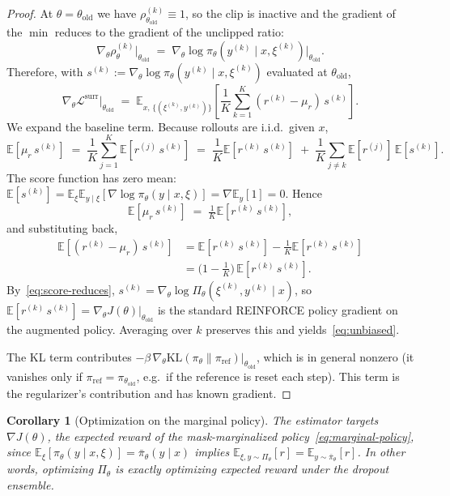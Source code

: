 \documentclass[11pt]{article}
\newtheorem{corollary}[theorem]{Corollary}
\theoremstyle{definition}
\theoremstyle{remark}
\newcommand{\E}{\mathbb{E}}
\newcommand{\KL}{\mathrm{KL}}
\newcommand{\Loss}{\mathcal{L}}
\newcommand{\old}{\mathrm{old}}
\begin{document}
\begin{proof}
At $\theta = \theta_\old$ we have $\rho_{\theta_\old}^{(k)} \equiv 1$, so
the clip is inactive and the gradient of the $\min$ reduces to the
gradient of the unclipped ratio:
\[
\nabla_\theta \rho_\theta^{(k)}\big|_{\theta_\old}
   \;=\;
\nabla_\theta \log \pi_\theta(y^{(k)}\mid x,\xi^{(k)})\big|_{\theta_\old}.
\]
Therefore, with $s^{(k)} := \nabla_\theta \log \pi_\theta(y^{(k)}\mid x,\xi^{(k)})$
evaluated at $\theta_\old$,
\begin{equation}
\nabla_\theta \Loss^{\mathrm{surr}}\big|_{\theta_\old}
  \;=\;
\E_{x,\,\{(\xi^{(k)},y^{(k)})\}}\!\left[\frac{1}{K}\sum_{k=1}^K
   (r^{(k)} - \mu_r)\,s^{(k)}\right].
\label{eq:proof-step1}
\end{equation}
We expand the baseline term.  Because rollouts are i.i.d.\ given $x$,
\[
\E[\mu_r\,s^{(k)}]
  \;=\;
\frac{1}{K}\sum_{j=1}^K \E[r^{(j)}\,s^{(k)}]
  \;=\;
\frac{1}{K}\E[r^{(k)}\,s^{(k)}]
  \;+\;
\frac{1}{K}\sum_{j\neq k}\E[r^{(j)}]\,\E[s^{(k)}].
\]
The score function has zero mean: $\E[s^{(k)}] = \E_\xi \E_{y\mid \xi}
[\nabla\log\pi_\theta(y\mid x,\xi)] = \nabla \E_y[1] = 0$.  Hence
\[
\E[\mu_r\,s^{(k)}] \;=\; \tfrac{1}{K}\E[r^{(k)}\,s^{(k)}],
\]
and substituting back,
\begin{align*}
\E[(r^{(k)} - \mu_r)\,s^{(k)}]
  &= \E[r^{(k)}\,s^{(k)}] - \tfrac{1}{K}\E[r^{(k)}\,s^{(k)}] \\
  &= \big(1 - \tfrac{1}{K}\big)\,\E[r^{(k)}\,s^{(k)}].
\end{align*}
By~\eqref{eq:score-reduces},
$s^{(k)} = \nabla_\theta\log\Pi_\theta(\xi^{(k)},y^{(k)}\mid x)$, so
$\E[r^{(k)}\,s^{(k)}] = \nabla_\theta J(\theta)|_{\theta_\old}$ is the
standard REINFORCE policy gradient on the augmented policy.  Averaging
over $k$ preserves this and yields~\eqref{eq:unbiased}.

The KL term contributes
$-\beta\,\nabla_\theta\KL(\pi_\theta\|\pi_{\mathrm{ref}})|_{\theta_\old}$,
which is in general nonzero (it vanishes only if
$\pi_{\mathrm{ref}} = \pi_{\theta_\old}$, e.g.\ if the reference is reset
each step).  This term is the regularizer's contribution and has known
gradient.
\end{proof}

\begin{corollary}[Optimization on the marginal policy]
\label{cor:marginal}
The estimator targets $\nabla J(\theta)$, the expected reward of the
mask-marginalized policy~\eqref{eq:marginal-policy}, since
$\E_\xi[\pi_\theta(y\mid x,\xi)] = \bar\pi_\theta(y\mid x)$ implies
$\E_{\xi,y\sim\Pi_\theta}[r] = \E_{y\sim\bar\pi_\theta}[r]$.  In other
words, optimizing $\Pi_\theta$ is exactly optimizing expected reward under
the dropout ensemble.
\end{corollary}
\end{document}
